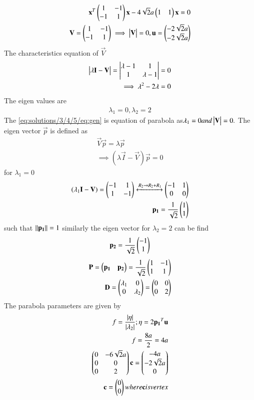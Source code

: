 \begin{align}
\mathbf{x}^T\begin{pmatrix}1&-1\\-1&1\end{pmatrix}\mathbf{x}-4\sqrt{2}a\begin{pmatrix}1&1\end{pmatrix}\mathbf{x}=0 \label{eq:solutions/3/4/5/eq:gen}\\
\mathbf{V}=\begin{pmatrix}1&-1\\-1&1\end{pmatrix}\implies\begin{vmatrix}\mathbf{V}\end{vmatrix}=0,\mathbf{u}=\begin{pmatrix}-2\sqrt{2}a\\-2\sqrt{2}a\end{pmatrix}
\end{align}
The characteristics equation of $\vec{V}$
\begin{align}
\begin{vmatrix}\lambda\mathbf{I}-\mathbf{V}\end{vmatrix}=\begin{vmatrix}\lambda-1&1\\1&\lambda-1\end{vmatrix}=0\\
\implies\lambda^{2}-2\lambda=0
\end{align}
The eigen values are
\begin{align}
  \lambda{_1}=0,\lambda{_2} =2
\end{align}
 The \eqref{eq:solutions/3/4/5/eq:gen} is equation of parabola as$\lambda{_1}=0 and \begin{vmatrix}\mathbf{V}\end{vmatrix}=0.$ 
The eigen vector $\vec{p}$ is defined as
\begin{align}
    \vec{V}\vec{p}=\lambda{\vec{p}}\\
    \implies(\lambda{\vec{I}}-\vec{V})\vec{p}=0
\end{align}
for $\lambda{_1}=0$
\begin{align}
(\lambda{_1}\mathbf{I}-\mathbf{V})= \begin{pmatrix}-1&1\\1&-1\end{pmatrix}\xleftrightarrow[]{R_2\rightarrow{R_2+R_1}}\begin{pmatrix}-1&1\\0&0\end{pmatrix}\\\mathbf{p_1}=\frac{1}{\sqrt{2}}\begin{pmatrix}1\\1\end{pmatrix}
\end{align}
such that $\left\lVert\mathbf{p_1}\right\rVert=1$ similarly the eigen vector for $\lambda{_2}=2$ can be find
\begin{align}
    \mathbf{p_2}=\frac{1}{\sqrt{2}}\begin{pmatrix}-1\\1\end{pmatrix}
\end{align}
\begin{align}
\mathbf{P}=\begin{pmatrix}\mathbf{p_1}&\mathbf{p_2}\end{pmatrix}=\frac{1}{\sqrt{2}}\begin{pmatrix}1&-1\\1&1\end{pmatrix}\\
\mathbf{D}=\begin{pmatrix}\lambda_1&0\\0&\lambda_2\end{pmatrix}=\begin{pmatrix}0&0\\0&2\end{pmatrix}
\end{align}
The parabola parameters are given by
\begin{align}
    f=\frac{|\eta|}{|\lambda{_2}|} ; \eta=2\mathbf{p_1}^T\mathbf{u}\\
    f= \frac{8a}{2}=4a\\
    \begin{pmatrix}0 &-6\sqrt{2}a \\ 0 & 0 \\ 0 & 2\end{pmatrix}\mathbf{c}=\begin{pmatrix}-4a\\-2\sqrt{2}a\\0\\\end{pmatrix}\\
    \mathbf{c}=\begin{pmatrix}0\\0\end{pmatrix} where \mathbf{c} is vertex
\end{align}

